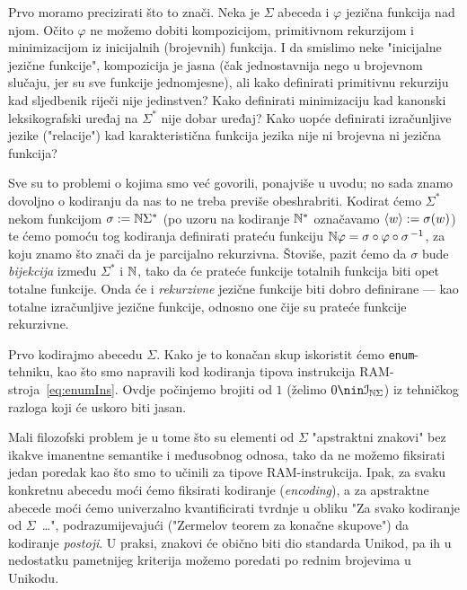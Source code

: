 Prvo moramo precizirati što to znači. Neka je $\Sigma$ abeceda i $\varphi$ jezična funkcija nad njom. Očito $\varphi$ ne možemo dobiti kompozicijom, primitivnom rekurzijom i minimizacijom iz inicijalnih (brojevnih) funkcija. I da smislimo neke "inicijalne jezične funkcije", kompozicija je jasna (čak jednostavnija nego u brojevnom slučaju, jer su sve funkcije jednomjesne), ali kako definirati primitivnu rekurziju kad sljedbenik riječi nije jedinstven? Kako definirati minimizaciju kad kanonski leksikografski uređaj na $\Sigma^*$ nije dobar uređaj? Kako uopće definirati izračunljive jezike ("relacije") kad karakteristična funkcija jezika nije ni brojevna ni jezična funkcija?

Sve su to problemi o kojima smo već govorili, ponajviše u uvodu; no sada znamo dovoljno o kodiranju da nas to ne treba previše obeshrabriti. Kodirat ćemo $\Sigma^*$ nekom funkcijom $\sigma:={\mathbb N}\Sigma^*$ (po uzoru na kodiranje ${\mathbb N}^*$ označavamo $\langle w\rangle:=\sigma(w)$) te ćemo pomoću tog kodiranja definirati prateću funkciju ${\mathbb N}\varphi=\sigma\circ\varphi\circ\sigma^{\,-1}$, za koju znamo što znači da je parcijalno rekurzivna.
Štoviše, pazit ćemo da $\sigma$ bude \emph{bijekcija} između $\Sigma^*$ i ${\mathbb N}$, tako da će prateće funkcije totalnih funkcija biti opet totalne funkcije. Onda će i \emph{rekurzivne} jezične funkcije biti dobro definirane --- kao totalne izračunljive jezične funkcije, odnosno one čije su prateće funkcije rekurzivne.


Prvo kodirajmo abecedu $\Sigma$. Kako je to konačan skup iskoristit ćemo \texttt{enum}-tehniku, kao što smo napravili kod kodiranja tipova instrukcija RAM-stroja~\eqref{eq:enumIns}. Ovdje počinjemo brojiti od $1$ (želimo $0\nin\im{\N\Sigma}$) iz tehničkog razloga koji će uskoro biti jasan.

Mali filozofski problem je u tome što su elementi od $\Sigma$ "apstraktni znakovi" bez ikakve imanentne semantike i međusobnog odnosa, tako da ne možemo fiksirati jedan poredak kao što smo to učinili za tipove RAM-instrukcija. Ipak, za svaku konkretnu abecedu moći ćemo fiksirati kodiranje (\emph{encoding}), a za apstraktne abecede moći ćemo univerzalno kvantificirati tvrdnje u obliku "Za svako kodiranje od $\Sigma$~\ldots", podrazumijevajući ("Zermelov teorem za konačne skupove") da kodiranje \emph{postoji}. U praksi, znakovi će obično biti dio standarda Unikod, pa ih u nedostatku pametnijeg kriterija možemo poredati po rednim brojevima u Unikodu.


